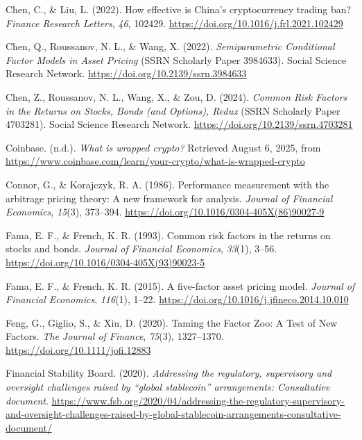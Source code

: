 \documentclass[
  12pt,
  a4paper,
  openany]{scrbook}
\newlength{\cslhangindent}
\newenvironment{CSLReferences}[2] %
 {\begin{list}{}{%
  \setlength{\itemindent}{0pt}
  \setlength{\leftmargin}{0pt}
  \setlength{\parsep}{0pt}
  \ifodd #1
   \setlength{\leftmargin}{\cslhangindent}
   \setlength{\itemindent}{-1\cslhangindent}
  \fi
  \setlength{\itemsep}{#2\baselineskip}}}
 {\end{list}}
\begin{document}
\begin{CSLReferences}{1}{0}
Chen, C., \& Liu, L. (2022). How effective is China's cryptocurrency
trading ban? \emph{Finance Research Letters}, \emph{46}, 102429.
\url{https://doi.org/10.1016/j.frl.2021.102429}

Chen, Q., Roussanov, N. L., \& Wang, X. (2022). \emph{Semiparametric
Conditional Factor Models in Asset Pricing} (SSRN Scholarly Paper
3984633). Social Science Research Network.
\url{https://doi.org/10.2139/ssrn.3984633}

Chen, Z., Roussanov, N. L., Wang, X., \& Zou, D. (2024). \emph{Common
Risk Factors in the Returns on Stocks, Bonds (and Options), Redux} (SSRN
Scholarly Paper 4703281). Social Science Research Network.
\url{https://doi.org/10.2139/ssrn.4703281}

Coinbase. (n.d.). \emph{What is wrapped crypto?} Retrieved August 6,
2025, from
\url{https://www.coinbase.com/learn/your-crypto/what-is-wrapped-crypto}

Connor, G., \& Korajczyk, R. A. (1986). Performance measurement with the
arbitrage pricing theory: A new framework for analysis. \emph{Journal of
Financial Economics}, \emph{15}(3), 373--394.
\url{https://doi.org/10.1016/0304-405X(86)90027-9}

Fama, E. F., \& French, K. R. (1993). Common risk factors in the returns
on stocks and bonds. \emph{Journal of Financial Economics},
\emph{33}(1), 3--56. \url{https://doi.org/10.1016/0304-405X(93)90023-5}

Fama, E. F., \& French, K. R. (2015). A five-factor asset pricing model.
\emph{Journal of Financial Economics}, \emph{116}(1), 1--22.
\url{https://doi.org/10.1016/j.jfineco.2014.10.010}

Feng, G., Giglio, S., \& Xiu, D. (2020). Taming the Factor Zoo: A Test
of New Factors. \emph{The Journal of Finance}, \emph{75}(3), 1327--1370.
\url{https://doi.org/10.1111/jofi.12883}

Financial Stability Board. (2020). \emph{Addressing the regulatory,
supervisory and oversight challenges raised by {``global stablecoin''}
arrangements: Consultative document}.
\url{https://www.fsb.org/2020/04/addressing-the-regulatory-supervisory-and-oversight-challenges-raised-by-global-stablecoin-arrangements-consultative-document/}


\end{CSLReferences}
\end{document}
